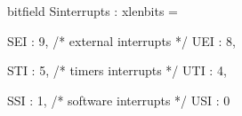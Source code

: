 bitfield Sinterrupts : xlenbits = {
  SEI : 9,  /* external interrupts */
  UEI : 8,

  STI : 5,  /* timers interrupts */
  UTI : 4,

  SSI : 1,  /* software interrupts */
  USI : 0
}
